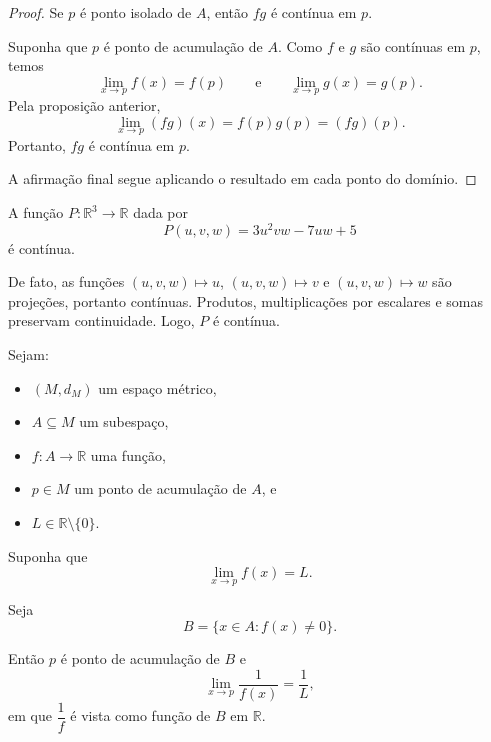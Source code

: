 \begin{proof}
    Se $p$ é ponto isolado de $A$, então $fg$ é contínua em $p$.

    Suponha que $p$ é ponto de acumulação de $A$.
    Como $f$ e $g$ são contínuas em $p$, temos
    \[
        \lim_{x\to p}f(x)=f(p)
        \qquad\text{e}\qquad
        \lim_{x\to p}g(x)=g(p).
    \]
    Pela proposição anterior,
    \[
        \lim_{x\to p}(fg)(x)=f(p)g(p)=(fg)(p).
    \]
    Portanto, $fg$ é contínua em $p$.

    A afirmação final segue aplicando o resultado em cada ponto do domínio.
\end{proof}

\begin{example}
    A função $P:\mathbb R^3\to\mathbb R$ dada por
    \[
        P(u,v,w)=3u^2vw-7uw+5
    \]
    é contínua.

    De fato, as funções $(u,v,w)\mapsto u$, $(u,v,w)\mapsto v$ e $(u,v,w)\mapsto w$ são projeções, portanto contínuas.
    Produtos, multiplicações por escalares e somas preservam continuidade.
    Logo, $P$ é contínua.
\end{example}

\begin{proposition}\label{prop:inversaMultiplicativa}
    Sejam:
    \begin{itemize}
        \item $(M,d_M)$ um espaço métrico,
        \item $A\subseteq M$ um subespaço,
        \item $f:A\to\mathbb R$ uma função,
        \item $p\in M$ um ponto de acumulação de $A$, e
        \item $L\in\mathbb R\setminus\{0\}$.
    \end{itemize}

    Suponha que
    \[
        \lim_{x\to p}f(x)=L.
    \]

    Seja
    \[
        B=\{x\in A:f(x)\neq 0\}.
    \]

    Então $p$ é ponto de acumulação de $B$ e
    \[
        \lim_{x\to p}\dfrac{1}{f(x)}=\dfrac{1}{L},
    \]
    em que $\dfrac{1}{f}$ é vista como função de $B$ em $\mathbb R$.
\end{proposition}

